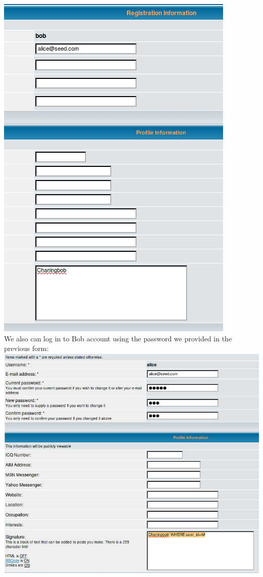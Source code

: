 \documentclass[12pt, a4paper]{article}
\begin{document}
\includegraphics[width=.95\textwidth]{gfx/sql/changed_bob.png}\\
We also can log in to Bob account using the password we provided in the previous form:\\
\includegraphics[width=.95\textwidth]{gfx/sql/chainging_alice.png}\\
\end{document}
